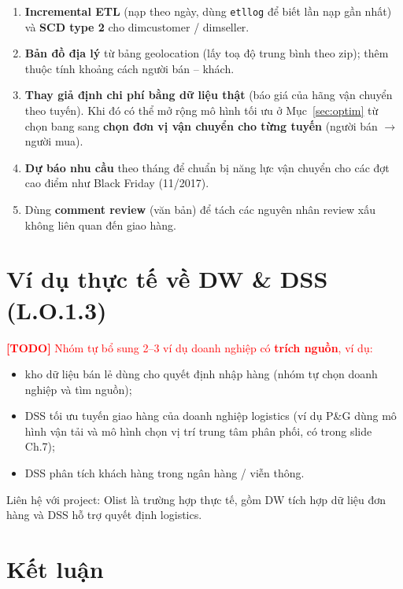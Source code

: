 \documentclass[12pt,a4paper]{report}
\newcommand{\todo}[1]{\textcolor{red}{\textbf{[TODO]} #1}}
\newcommand{\code}[1]{\texttt{#1}}
\renewcommand{\_}{\oldunderscore\allowbreak}
\begin{document}
\begin{enumerate}
\item \textbf{Incremental ETL} (nạp theo ngày, dùng \code{etl\_log} để biết lần nạp gần nhất) và \textbf{SCD type 2} cho dim\_customer / dim\_seller.
\item \textbf{Bản đồ địa lý} từ bảng geolocation (lấy toạ độ trung bình theo zip); thêm thuộc tính khoảng cách người bán -- khách.
\item \textbf{Thay giả định chi phí bằng dữ liệu thật} (báo giá của hãng vận chuyển theo tuyến). Khi đó có thể mở rộng mô hình tối ưu ở Mục~\ref{sec:optim} từ chọn bang sang \textbf{chọn đơn vị vận chuyển cho từng tuyến} (người bán $\rightarrow$ người mua).
\item \textbf{Dự báo nhu cầu} theo tháng để chuẩn bị năng lực vận chuyển cho các đợt cao điểm như Black Friday (11/2017).
\item Dùng \textbf{comment review} (văn bản) để tách các nguyên nhân review xấu không liên quan đến giao hàng.
\end{enumerate}

\section{Ví dụ thực tế về DW \& DSS (L.O.1.3)}\label{sec:examples}

\todo{Nhóm tự bổ sung 2--3 ví dụ doanh nghiệp có \textbf{trích nguồn}, ví dụ:}
\begin{itemize}
\item kho dữ liệu bán lẻ dùng cho quyết định nhập hàng (nhóm tự chọn doanh nghiệp và tìm nguồn);
\item DSS tối ưu tuyến giao hàng của doanh nghiệp logistics (ví dụ P\&G dùng mô hình vận tải và mô hình chọn vị trí trung tâm phân phối, có trong slide Ch.7);
\item DSS phân tích khách hàng trong ngân hàng / viễn thông.
\end{itemize}
Liên hệ với project: Olist là trường hợp thực tế, gồm DW tích hợp dữ liệu đơn hàng và DSS hỗ trợ quyết định logistics.

\section{Kết luận}
\end{document}
